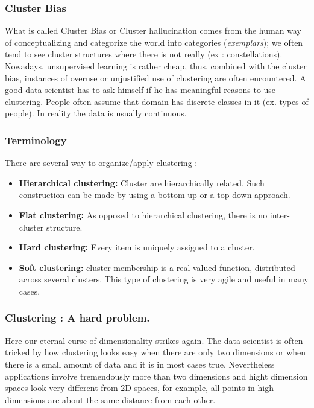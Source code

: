 \subsubsection{Cluster Bias}

What is called Cluster Bias or Cluster hallucination comes from the human way of conceptualizing and categorize the world into categories (\emph{exemplars}); we often tend to see cluster structures where there is not really (ex : constellations). Nowadays, unsupervised learning is rather cheap, thus, combined with the cluster bias, instances of overuse or unjustified use of clustering are often encountered. A good data scientist has to ask himself if he has meaningful reasons to use clustering. People often assume that domain has discrete classes in it (ex. types of people). In reality the data is usually continuous. 

\subsubsection{Terminology}
There are several way to organize/apply clustering :
\begin{itemize}
	\item \textbf{Hierarchical clustering: } Cluster are hierarchically related. Such construction can be made by using a bottom-up or a top-down approach.
	\item \textbf{Flat clustering: } As opposed to hierarchical clustering, there is no inter-cluster structure.
	\item \textbf{Hard clustering: } Every item is uniquely assigned to a cluster.
	\item \textbf{Soft clustering: } cluster membership is a real valued function, distributed across several clusters. This type of clustering is very agile and useful in many cases.
\end{itemize}

\subsubsection{Clustering : A hard problem.}
Here our eternal curse of dimensionality strikes again. The data scientist is often tricked by how clustering looks easy when there are only two dimensions or when there is a small amount of data and it is in most cases true. Nevertheless applications involve tremendously more than two dimensions and hight dimension spaces look very different from 2D spaces, for example, all points in high dimensions are about the same distance from each other. 

